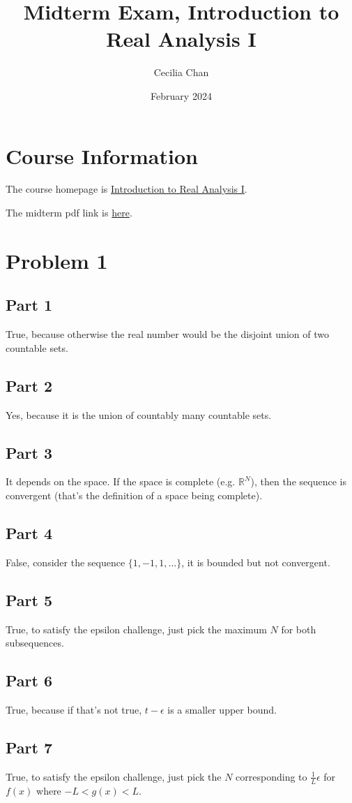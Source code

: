 \documentclass{article}
\title{Midterm Exam, Introduction to Real Analysis I}
\author{Cecilia Chan}
\date{February 2024}
\begin{document}
\section*{Course Information}
The course homepage is \href{https://math.rutgers.edu/academics/undergraduate/courses/955-01-640-311-introduction-to-real-analysis-i}{Introduction to Real Analysis I}.

The midterm pdf link is \href{https://math.rutgers.edu/images/test-311-10-2016.pdf}{here}.
\section*{Problem 1}
\subsection*{Part 1}
True, because otherwise the real number would be the disjoint union of two countable sets.
\subsection*{Part 2}
Yes, because it is the union of countably many countable sets.
\subsection*{Part 3}
It depends on the space. If the space is complete (e.g. $ \mathbb{R}^N $), then the sequence is convergent (that's the definition of a space being complete).
\subsection*{Part 4}
False, consider the sequence $ \{1, -1, 1, \ldots \} $, it is bounded but not convergent.
\subsection*{Part 5}
True, to satisfy the epsilon challenge, just pick the maximum $ N $ for both subsequences.
\subsection*{Part 6}
True, because if that's not true, $ t - \epsilon $ is a smaller upper bound.
\subsection*{Part 7}
True, to satisfy the epsilon challenge, just pick the $ N $ corresponding to $ \frac{1}{L} \epsilon $ for $ f(x) $ where $ -L < g(x) < L$.
\end{document}
